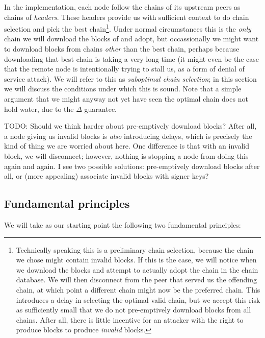 In the implementation, each node follow the chains of its upstream peers as
chains of \emph{headers}. These headers provide us with sufficient context to do
chain selection and pick the best chain\footnote{Technically speaking this is a
preliminary chain selection, because the chain we chose might contain invalid
blocks. If this is the case, we will notice when we download the blocks and
attempt to actually adopt the chain in the chain database. We will then
disconnect from the peer that served us the offending chain, at which point a
different chain might now be the preferred chain. This introduces a delay in
selecting the optimal valid chain, but we accept this risk as sufficiently small
that we do not pre-emptively download blocks from all chains. After all, there
is little incentive for an attacker with the right to produce blocks to produce
\emph{invalid} blocks.}. Under normal circumstances this is the \emph{only}
chain we will download the blocks of and adopt, but occassionally we might want
to download blocks from chains \emph{other} than the best chain, perhaps because
downloading that best chain is taking a very long time (it might even be the
case that the remote node is intentionally trying to stall us, as a form of
denial of service attack). We will refer to this as \emph{suboptimal chain
selection}; in this section we will discuss the conditions under which this is
sound. Note that a simple argument that we might anyway not yet have seen the
optimal chain does not hold water, due to the $\Delta$ guarantee.

TODO: Should we think harder about pre-emptively download blocks?
After all, a node giving us invalid blocks is \emph{also} introducing delays,
which is precisely the kind of thing we are worried about here.
One difference is that with an invalid block, we will disconnect; however,
nothing is stopping a node from doing this again and again.
I see two possible solutions: pre-emptively download blocks after all, or
(more appealing) associate invalid blocks with signer keys?

\subsection{Fundamental principles}

We will take as our starting point the following two fundamental principles:

